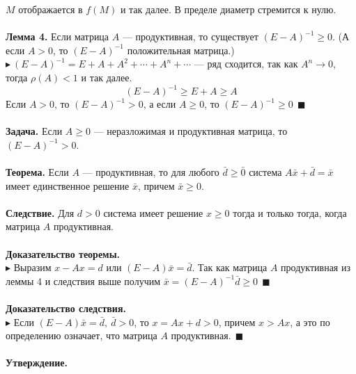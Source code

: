 \documentclass[12pt]{article}
\theoremstyle{definition}
\numberwithin{equation}{section}
\begin{document}
$M$ отображается в $f(M)$ и так далее. В пределе диаметр стремится к нулю.\\
\\
\textbf{Лемма 4.} Если матрица $A$ --- продуктивная, то существует $(E-A)^{-1}\geqslant 0$. (А если $A>0$, то $(E-A)^{-1}$ положительная матрица.)\\
$\blacktriangleright~(E-A)^{-1}=E+A+A^2+\cdots +A^n+\cdots$ --- ряд сходится, так как $A^n \to 0$, тогда $\rho(A)<1$ и так далее.\\
$$(E-A)^{-1}\geqslant E+A \geqslant A$$
Если $A>0$, то $(E-A)^{-1}>0$, а если $A\geqslant 0$, то $(E-A)^{-1}\geqslant 0~~\blacksquare$\\
\\
\textbf{Задача.} Если $A\geqslant 0$ --- неразложимая и продуктивная матрица, то $(E-A)^{-1}>0$.\\
\\
\textbf{Теорема.} Если $A$ --- продуктивная, то для любого $\bar d \geqslant \bar 0$ система $A\bar x+\bar d=\bar x$ имеет единственное решение $\bar x$, причем $\bar x \geqslant 0$.\\
\\
\textbf{Следствие.} Для $d>0$ система имеет решение $x \geqslant 0$ тогда и только тогда, когда матрица $A$ продуктивная.\\
\\
\textbf{Доказательство теоремы.}\\
$\blacktriangleright$ Выразим $x-Ax=d$ или $(E-A)\bar x=\bar d$. Так как матрица $A$ продуктивная из леммы 4 и следствия выше получим $\bar x=(E-A)^{-1}\bar d\geqslant 0~~\blacksquare$\\
\\
\textbf{Доказательство следствия.}\\
$\blacktriangleright$ Если $(E-A)\bar x=\bar d,~\bar d>0$, то $x=Ax+d>0$, причем $x>Ax$, а это по определению означает, что матрица $A$ продуктивная.$~~\blacksquare$\\
\\
\textbf{Утверждение.}
\end{document}
